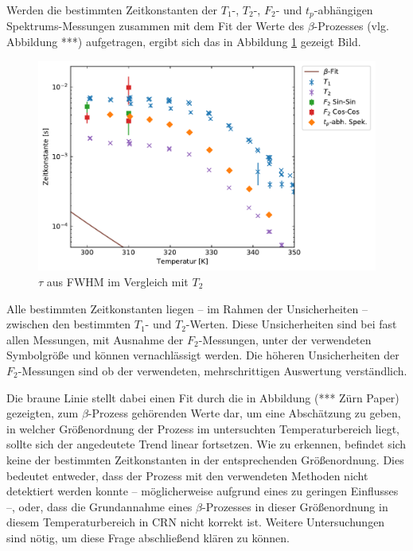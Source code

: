 Werden die bestimmten Zeitkonstanten der $T_1$-, $T_2$-, $F_2$- und $t_p$-abhängigen Spektrums-Messungen zusammen mit dem Fit der Werte des $\beta$-Prozesses (vlg. Abbildung ***) aufgetragen, ergibt sich das in Abbildung \ref{fig:res:dynvgl} gezeigt Bild.
\begin{figure}
	\begin{center}
		\includegraphics[width=\textwidth]{graphics/plot/dyn.pdf}
	\end{center}
	\caption{$\tau$ aus FWHM im Vergleich mit $T_2$} \label{fig:res:dynvgl}
\end{figure}

Alle bestimmten Zeitkonstanten liegen -- im Rahmen der Unsicherheiten -- zwischen den bestimmten $T_1$- und $T_2$-Werten. Diese Unsicherheiten sind bei fast allen Messungen, mit Ausnahme der $F_2$-Messungen, unter der verwendeten Symbolgröße und können vernachlässigt werden. Die höheren Unsicherheiten der $F_2$-Messungen sind ob der verwendeten, mehrschrittigen Auswertung verständlich.

Die braune Linie stellt dabei einen Fit durch die in Abbildung (*** Zürn Paper) gezeigten, zum $\beta$-Prozess gehörenden Werte dar, um eine Abschätzung zu geben, in welcher Größenordnung der Prozess im untersuchten Temperaturbereich liegt, sollte sich der angedeutete Trend linear fortsetzen. Wie zu erkennen, befindet sich keine der bestimmten Zeitkonstanten in der entsprechenden Größenordnung. Dies bedeutet entweder, dass der Prozess mit den verwendeten Methoden nicht detektiert werden konnte -- möglicherweise aufgrund eines zu geringen Einflusses --, oder, dass die Grundannahme eines $\beta$-Prozesses in dieser Größenordnung in diesem Temperaturbereich in CRN nicht korrekt ist. Weitere Untersuchungen sind nötig, um diese Frage abschließend klären zu können.



